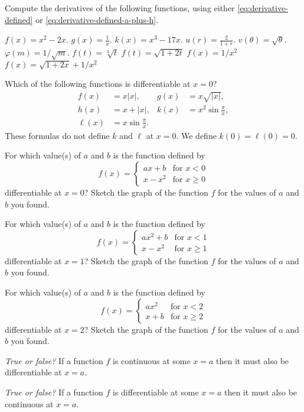 \begin{multicols}{2}\setlength{\parindent}{0pt}
\noindent%
Compute the derivatives of the following functions,
using either \eqref{eq:derivative-defined} or
\eqref{eq:derivative-defined-a-plus-h}.

\problem $f(x) = x^2-2x $. 
\problem $g(x) = \frac1x $. 
\problem $k(x) = x^3-17x $. 
\problem $u(r) = \frac2{1+r} $. 
\problem $v(\theta) = \sqrt{\theta} $. 
\problem $\varphi(m) = 1/{\sqrt m}$. 
\problem $f(t) = \sqrt[3]{t}$ 
\problem $f(t) = \sqrt{1+2t}$ 
\problem $f(x) = 1/x^2$ 
\problem $f(x) = \sqrt{1+2x} + 1/x^2$ 




\problem Which of the following functions is differentiable at $x=0$? 
\begin{align*}
  f(x) &= x|x|, &g(x) &= x\sqrt{|x|}, \\
  h(x) &= x+|x|, &k(x) &= x^2\sin\frac\pi x,\\
  \ell(x) &= x\sin\frac\pi x.&&
\end{align*}
These formulas do not define $k$ and $\ell$ at $x=0$.  We define $k(0) =
\ell(0) = 0$.

\problem For which value(s) of $a$ and $b$ is the function defined by 
\[
f(x) = \begin{cases}
  ax+b &\text{for $x<0$} \\
  x-x^2 & \text{for $x\geq 0$}
\end{cases}
\]
differentiable at $x=0$?  Sketch the graph of the function $f$ for the
values of $a$ and $b$ you found.

\problem For which value(s) of $a$ and $b$ is the function defined by 
\[
f(x) = \begin{cases}
  ax^2+b &\text{for $x<1$} \\
  x-x^2 & \text{for $x\geq 1$}
\end{cases}
\]
differentiable at $x=1$?  Sketch the graph of the function $f$ for the
values of $a$ and $b$ you found.

\problem For which value(s) of $a$ and $b$ is the function defined by 
\[
f(x) = \begin{cases}
  ax^2 &\text{for $x<2$} \\
  x +b& \text{for $x\geq 2$}
\end{cases}
\]
differentiable at $x=2$?  Sketch the graph of the function $f$ for the
values of $a$ and $b$ you found.

\problem \groupproblem 
\textit{True or false? } If a function $f$ is continuous at some $x=a$
then it must also be differentiable at $x=a$.

\problem \groupproblem 
\textit{True or false? } If a function $f$ is differentiable at some
$x=a$ then it must also be continuous at $x=a$.




\end{multicols}





